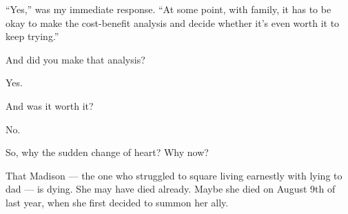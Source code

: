 ``Yes,'' was my immediate response. ``At some point, with family, it has to be okay to make the cost-benefit analysis and decide whether it's even worth it to keep trying.''

\begin{ally}
  And did you make that analysis?
\end{ally}

Yes.

\begin{ally}
  And was it worth it?
\end{ally}

No.

\begin{ally}
  So, why the sudden change of heart? Why now?
\end{ally}

That Madison --- the one who struggled to square living earnestly with lying to dad --- is dying. She may have died already. Maybe she died on August 9th of last year, when she first decided to summon her ally.

\newpage

